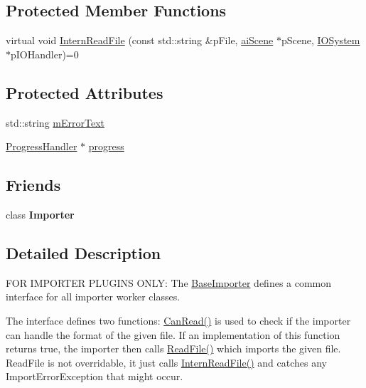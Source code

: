 \subsection*{Protected Member Functions}
\begin{DoxyCompactItemize}
\item 
virtual void \hyperlink{class_assimp_1_1_base_importer_ac67d9f5ceb26353d27d6be06cccad398}{Intern\+Read\+File} (const std\+::string \&p\+File, \hyperlink{structai_scene}{ai\+Scene} $\ast$p\+Scene, \hyperlink{class_assimp_1_1_i_o_system}{I\+O\+System} $\ast$p\+I\+O\+Handler)=0
\end{DoxyCompactItemize}
\subsection*{Protected Attributes}
\begin{DoxyCompactItemize}
\item 
std\+::string \hyperlink{class_assimp_1_1_base_importer_a7531969813de75ee5ae2f6be245abfb8}{m\+Error\+Text}
\item 
\hyperlink{class_assimp_1_1_progress_handler}{Progress\+Handler} $\ast$ \hyperlink{class_assimp_1_1_base_importer_addeaa8583012cf1727194710321ca02b}{progress}
\end{DoxyCompactItemize}
\subsection*{Friends}
\begin{DoxyCompactItemize}
\item 
\hypertarget{class_assimp_1_1_base_importer_ad2d8744585dcb094644b1caed04ac9ed}{class {\bfseries Importer}}\label{class_assimp_1_1_base_importer_ad2d8744585dcb094644b1caed04ac9ed}

\end{DoxyCompactItemize}


\subsection{Detailed Description}
F\+O\+R I\+M\+P\+O\+R\+T\+E\+R P\+L\+U\+G\+I\+N\+S O\+N\+L\+Y\+: The \hyperlink{class_assimp_1_1_base_importer}{Base\+Importer} defines a common interface for all importer worker classes.

The interface defines two functions\+: \hyperlink{class_assimp_1_1_base_importer_a13588d3396ba5b7ed1f1cb46e0945cfd}{Can\+Read()} is used to check if the importer can handle the format of the given file. If an implementation of this function returns true, the importer then calls \hyperlink{class_assimp_1_1_base_importer_a5e9568561199cd13f2935ef01ee5280c}{Read\+File()} which imports the given file. Read\+File is not overridable, it just calls \hyperlink{class_assimp_1_1_base_importer_ac67d9f5ceb26353d27d6be06cccad398}{Intern\+Read\+File()} and catches any Import\+Error\+Exception that might occur. 


